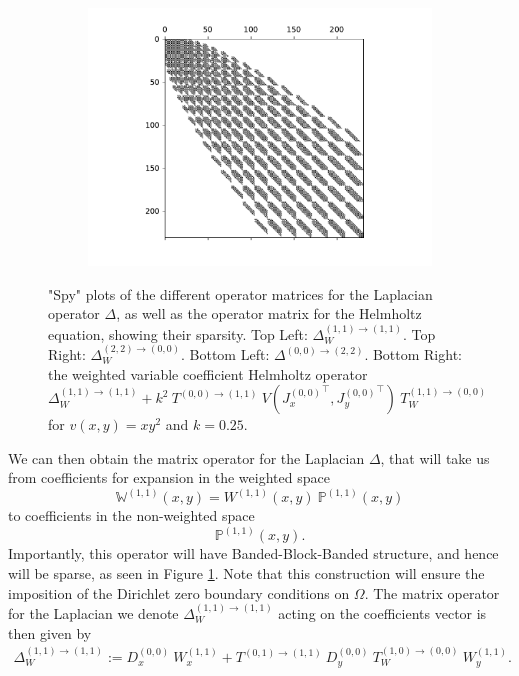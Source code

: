 \documentclass[11pt, oneside]{article}   	%
\newcommand{\Wii}{W^{(1,1)}}
\newcommand{\bigPii}{{\mathbb{P}^{(1,1)}}}
\newcommand{\laplacewii}{\Delta_W^{(1,1)\to(1,1)}}
\newcommand{\laplacewtt}{\Delta_W^{(2,2)\to(0,0)}}
\newcommand{\laplaceoo}{\Delta^{(0,0)\to(2,2)}}
\newcommand{\bigWii}{{\mathbb{W}^{(1,1)}}}
\begin{document}
\begin{figure}
\begin{subfigure}[t]{0.45\textwidth}
	\end{subfigure}
	\begin{subfigure}[t]{0.45\textwidth}
	\includegraphics[scale=0.4]{sparsityofhelmholtz}
	\end{subfigure}
	\centering
    	\caption{"Spy" plots of the different operator matrices for the Laplacian operator $\Delta$, as well as the operator matrix for the Helmholtz equation, showing their sparsity. Top Left: $\laplacewii$. Top Right: $\laplacewtt$. Bottom Left: $\laplaceoo$. Bottom Right: the weighted variable coefficient Helmholtz operator $\laplacewii + k^2 \: T^{(0,0)\to(1,1)} \: V({J_x^{(0,0)}}^\top, {J_y^{(0,0)}}^\top) \: T_W^{(1,1)\to(0,0)}$ for $v(x,y) = xy^2$ and $k = 0.25$.}
        \label{fig:sparsity}
\end{figure}

We can then obtain the matrix operator for the Laplacian \(\Delta\), that will take us from coefficients for expansion in the weighted space
\[
\bigWii(x,y) = \Wii(x,y) \: \bigPii(x,y)
\]
to coefficients in the non-weighted space
\[
\bigPii(x,y).
\]
Importantly, this operator will have Banded-Block-Banded structure, and hence will be sparse, as seen in Figure \ref{fig:sparsity}. Note that this construction will ensure the imposition of the Dirichlet zero boundary conditions on $\Omega$. The matrix operator for the Laplacian we denote $\laplacewii$ acting on the coefficients vector is then given by
\begin{align}
    \laplacewii := D_x^{(0,0)} \: W_x^{(1,1)} + T^{(0,1)\to(1,1)} \: D_y^{(0,0)} \: T_W^{(1,0)\to(0,0)} \: W_y^{(1,1)}.
\end{align}
\end{document}
